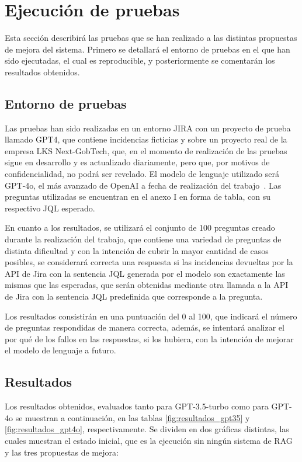 \section{Ejecución de pruebas}
Esta sección describirá las pruebas que se han realizado a las distintas propuestas de mejora del sistema. Primero se detallará el entorno de pruebas en el que han sido ejecutadas, el cual es reproducible, y posteriormente se comentarán los resultados obtenidos.

\subsection{Entorno de pruebas}
Las pruebas han sido realizadas en un entorno JIRA con un proyecto de prueba llamado GPT4, que contiene incidencias ficticias y sobre un proyecto real de la empresa LKS Next-GobTech, que, en el momento de realización de las pruebas sigue en desarrollo y es actualizado diariamente, pero que, por motivos de confidencialidad, no podrá ser revelado. El modelo de lenguaje utilizado será GPT-4o, el más avanzado de OpenAI a fecha de realización del trabajo~\cite{gpt4o}. Las preguntas utilizadas se encuentran en el anexo I en forma de tabla, con su respectivo JQL esperado.

En cuanto a los resultados, se utilizará el conjunto de 100 preguntas creado durante la realización del trabajo, que contiene una variedad de preguntas de distinta dificultad y con la intención de cubrir la mayor cantidad de casos posibles, se considerará correcta una respuesta si las incidencias devueltas por la API de Jira con la sentencia JQL generada por el modelo son exactamente las mismas que las esperadas, que serán obtenidas mediante otra llamada a la API de Jira con la sentencia JQL predefinida que corresponde a la pregunta.

Los resultados consistirán en una puntuación del 0 al 100, que indicará el número de preguntas respondidas de manera correcta, además, se intentará analizar el por qué de los fallos en las respuestas, si los hubiera, con la intención de mejorar el modelo de lenguaje a futuro.

\subsection{Resultados}
Los resultados obtenidos, evaluados tanto para GPT-3.5-turbo como para GPT-4o se muestran a continuación, en las tablas \ref{fig:resultados_gpt35} y \ref{fig:resultados_gpt4o}, respectivamente. Se dividen en dos gráficas distintas, las cuales muestran el estado inicial, que es la ejecución sin ningún sistema de RAG y las tres propuestas de mejora:

